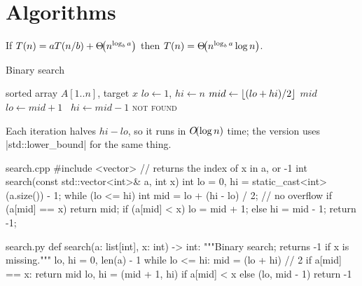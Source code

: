 \documentclass[10pt]{article}
\begin{document}
\section{Algorithms}

\begin{theorem*}
  If $T(n) = aT(n/b) + \bigT{n^{\log_b a}}$ then $T(n) = \bigT{n^{\log_b a}\log n}$.
\end{theorem*}

\begin{pseudo}{Binary search}
  \begin{algorithmic}[1]
    \Require sorted array $A[1..n]$, target $x$
    \State $lo \gets 1$, $hi \gets n$
      \State $mid \gets \lfloor(lo + hi)/2\rfloor$ 
       \Return $mid$
       $lo \gets mid + 1$
      \Else\ $hi \gets mid - 1$
      \EndIf
    \EndWhile
    \State \Return \textsc{not found}
  \end{algorithmic}
\end{pseudo}

Each iteration halves $hi - lo$, so it runs in $\bigO{\log n}$ time; the \CC{} version uses
\code|std::lower_bound| for the same thing.

\begin{codeblock}{search.cpp}
#include <vector>
// returns the index of x in a, or -1
int search(const std::vector<int>& a, int x) {
    int lo = 0, hi = static_cast<int>(a.size()) - 1;
    while (lo <= hi) {
        int mid = lo + (hi - lo) / 2;      // no overflow
        if (a[mid] == x) return mid;
        if (a[mid] < x) lo = mid + 1; else hi = mid - 1;
    }
    return -1;
}
\end{codeblock}

\begin{codeblock}[lang=Python]{search.py}
def search(a: list[int], x: int) -> int:
    """Binary search; returns -1 if x is missing."""
    lo, hi = 0, len(a) - 1
    while lo <= hi:
        mid = (lo + hi) // 2
        if a[mid] == x:
            return mid
        lo, hi = (mid + 1, hi) if a[mid] < x else (lo, mid - 1)
    return -1
\end{codeblock}

\end{document}

